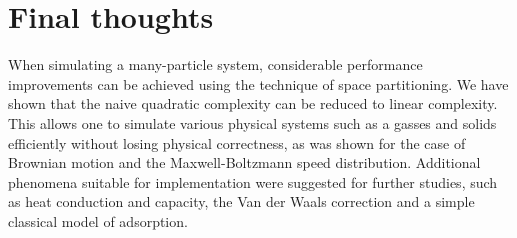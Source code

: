 \section{Final thoughts}

When simulating a many-particle system, considerable performance improvements 
can be achieved using the technique of space partitioning. We have shown that 
the naive quadratic complexity can be reduced to linear complexity. This allows 
one to simulate various physical systems such as a gasses and solids 
efficiently without losing physical correctness, as was shown for the case of 
Brownian motion and the Maxwell-Boltzmann speed distribution.  Additional 
phenomena suitable for implementation were suggested for further studies, such 
as heat conduction and capacity, the Van der Waals correction and a simple 
classical model of adsorption.
